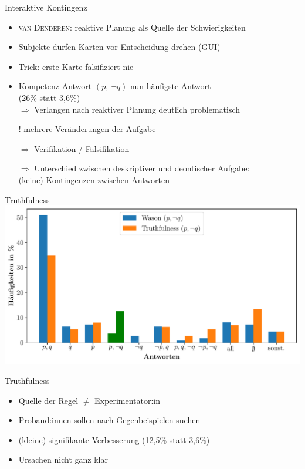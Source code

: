 \begin{frame}{Interaktive Kontingenz {\scriptsize \cite[S.~105,109]{stenningHumanReasoningCognitive2008}}}
    \begin{itemize}
        \item \textsc{van Denderen}: reaktive Planung als Quelle der Schwierigkeiten
        \item Subjekte dürfen Karten vor Entscheidung drehen (GUI)
        \item Trick: erste Karte falsifiziert nie
        
        \pause
        \item Kompetenz-Antwort $(p,~\lnot q)$ nun häufigste Antwort \\
        (26\% statt 3,6\%) \\
        $\Rightarrow$ Verlangen nach reaktiver Planung deutlich problematisch
        
        \item[!] mehrere Veränderungen der Aufgabe
        \item[$\Rightarrow$] Verifikation / Falsifikation
        \item[$\Rightarrow$] Unterschied zwischen deskriptiver und deontischer Aufgabe:\\
            (keine) Kontingenzen zwischen Antworten
    \end{itemize}
\end{frame}


\begin{frame}{Truthfulness {\scriptsize \cite[S.~109]{stenningHumanReasoningCognitive2008}}}
    \includegraphics[width=\textwidth]{../plot/results_truthfulness.pdf}
\end{frame}


\begin{frame}{Truthfulness {\scriptsize \cite[S.~107]{stenningHumanReasoningCognitive2008}}}
    \begin{itemize}
        \item Quelle der Regel $\ne$ Experimentator:in
        \item Proband:innen sollen nach Gegenbeispielen suchen
        \item (kleine) signifikante Verbesserung (12,5\% statt 3,6\%)
        \item Ursachen nicht ganz klar
    \end{itemize}
\end{frame}


